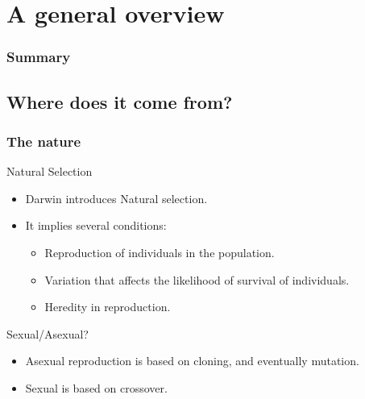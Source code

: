 \section{A general overview}

\begin{frame}
  \frametitle{Summary}
  \tableofcontents[currentsection]
\end{frame}

\subsection{Where does it come from?}

\begin{frame}
  \frametitle{The nature}
  \begin{block}{Natural Selection}
    \begin{itemize}
    \item Darwin\cite{darwin.1840.origin.of.species} introduces
      Natural selection.
    \item It implies several conditions:
      \begin{itemize}
      \item Reproduction of individuals in the population.
      \item Variation that affects the likelihood of survival of
        individuals.
      \item Heredity in reproduction.
      \end{itemize}
    \end{itemize}
  \end{block}

  \begin{block}{Sexual/Asexual?}
    \begin{itemize}
    \item Asexual reproduction is based on cloning, and
      eventually mutation.
    \item Sexual is based on crossover.
    \end{itemize}
  \end{block}
\end{frame}

